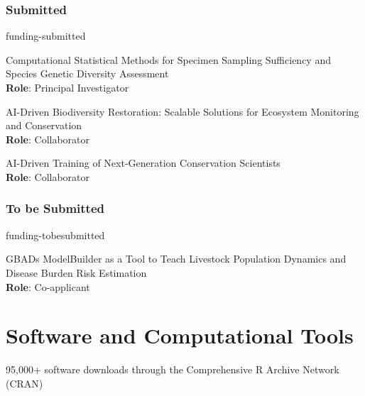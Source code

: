 \subsubsection{Submitted}
\begin{revlist}{funding-submitted}
\item {}
  Computational Statistical Methods for Specimen Sampling Sufficiency and
  Species Genetic Diversity Assessment\\
  \textbf{Role}: Principal Investigator
\item {}
  AI-Driven Biodiversity Restoration: Scalable Solutions for Ecosystem
  Monitoring and Conservation\\
  \textbf{Role}: Collaborator
\item {}
  AI-Driven Training of Next-Generation Conservation Scientists\\
  \textbf{Role}: Collaborator
\end{revlist}

\subsubsection{To be Submitted}
\begin{revlist}{funding-tobesubmitted}
\item {}
  GBADs ModelBuilder as a Tool to Teach Livestock Population Dynamics and
  Disease Burden Risk Estimation\\
  \textbf{Role}: Co-applicant
\end{revlist}

\section{Software and Computational Tools}
95,000+ software downloads through the Comprehensive R Archive Network (CRAN)

